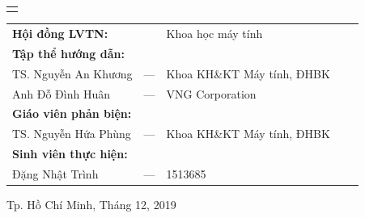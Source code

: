 \documentclass[a4paper,13pt]{report}
\begin{document}
\begin{titlepage}
\begin{center}
\begin{tabular}{c}
\\
\hline
\\

\end{tabular}
\end{center}

\vspace{1cm}

\begin{tabular}{lllll}
\hspace{3 cm} \textbf{Hội đồng LVTN:}& &Khoa học máy tính\\\addlinespace

\hspace{3 cm} \textbf{Tập thể hướng dẫn:}\\\addlinespace
\hspace{4 cm} TS. Nguyễn An Khương &---& Khoa KH\&KT Máy tính, ĐHBK  \\
\hspace{4 cm} Anh Đỗ Đình Huân &---& VNG Corporation \\\addlinespace

\hspace{3 cm} \textbf{Giáo viên phản biện:}\\\addlinespace
\hspace{4 cm} TS. Nguyễn Hứa Phùng &---& Khoa KH\&KT Máy tính, ĐHBK  \\\addlinespace

\hspace{3 cm} \textbf{Sinh viên thực hiện:} \\\addlinespace
\hspace{4 cm} Đặng Nhật Trình &---& 1513685 \\

\end{tabular}

\vspace{1.5cm}

\begin{center}
{\footnotesize Tp. Hồ Chí Minh, Tháng 12, 2019}
\end{center}
\end{titlepage}

\preface


% 
% 


\body
\printglossary[type=\acronymtype, title=Danh mục viết tắt, toctitle=Danh mục viết tắt]








% 



\appendix


% 
% 
% 

\printbibliography
\end{document}
